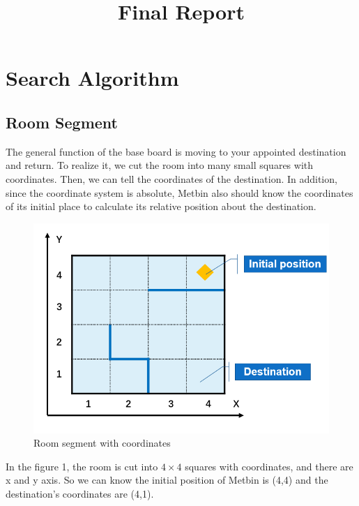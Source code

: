 \documentclass[12pt]{article}
\title{Final Report}
\begin{document}
\maketitle
\newpage
\section{Search Algorithm}
\subsection{Room Segment}
The general function of the base board is moving to your appointed destination and return. To realize it, we cut the room into many small squares with coordinates. Then, we can tell  the coordinates of the destination. In addition, since the coordinate system is absolute, Metbin also should know the coordinates of its initial place to calculate its relative position about the destination.
\begin{figure}[H]
\centering
\includegraphics[scale=0.8]{P1.jpg}
\caption{Room segment with coordinates}
\end{figure}
In the figure 1, the room is cut into $4\times4$ squares with coordinates, and there are x and y axis. So we can know the initial position of Metbin is (4,4) and the destination's coordinates are (4,1). 
\end{document}

